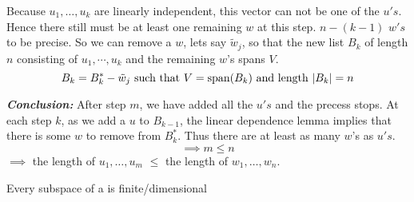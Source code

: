 \begin{prf}
  Because $u_1, \ldots, u_k$ are linearly independent, this vector can not be one of the $u's$. Hence there still must be at least one remaining $w$ at this step. $n-(k-1)$ $w's$ to be precise. So we can remove a $w$, lets say $\tilde w_j$, so that the new list $B_k$ of length $n$ consisting of $u_1, \cdots, u_k$ and the remaining $w$'s spans $V$. 
  \begin{equation}
    B_k = B_k^* - \tilde w_j$ such that $ V=\myspan{B_k}$ and length $|B_k|=n
  \end{equation}
  
  \emph{\bfseries Conclusion:} After step $m$, we have added all the $u's$ and the precess stops. At each step $k$, as we add a $u$ to $B_{k-1}$, the linear dependence lemma implies that there is some $w$ to remove from $B_{k}^*$. Thus there are at least as many $w$'s as $u's$.
  \begin{equation}
    \implies m \leq n
  \end{equation}
  $\implies$ the length of $u_1, \ldots, u_m$ $\leq$ the length of $w_1, \ldots, w_n$.
\end{prf}

\setcounter{thm}{24}
\begin{thm} 
  \label{thm: finite-dimensional subspace}
  Every subspace of a \findimvs is finite\-/dimensional
\end{thm}
